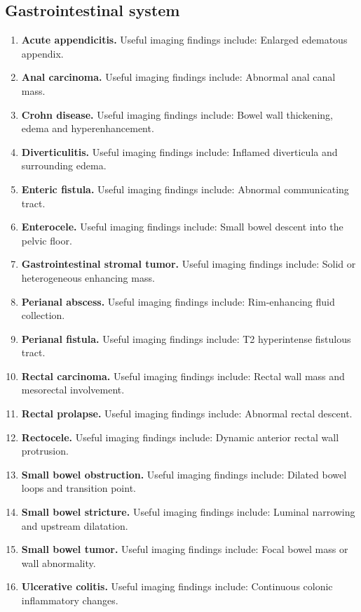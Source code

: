 \subsection{Gastrointestinal system}
\begin{enumerate}[leftmargin=*,itemsep=0.45em,topsep=0.4em]
\item \textbf{Acute appendicitis.} Useful imaging findings include: Enlarged edematous appendix.
\item \textbf{Anal carcinoma.} Useful imaging findings include: Abnormal anal canal mass.
\item \textbf{Crohn disease.} Useful imaging findings include: Bowel wall thickening, edema and hyperenhancement.
\item \textbf{Diverticulitis.} Useful imaging findings include: Inflamed diverticula and surrounding edema.
\item \textbf{Enteric fistula.} Useful imaging findings include: Abnormal communicating tract.
\item \textbf{Enterocele.} Useful imaging findings include: Small bowel descent into the pelvic floor.
\item \textbf{Gastrointestinal stromal tumor.} Useful imaging findings include: Solid or heterogeneous enhancing mass.
\item \textbf{Perianal abscess.} Useful imaging findings include: Rim-enhancing fluid collection.
\item \textbf{Perianal fistula.} Useful imaging findings include: T2 hyperintense fistulous tract.
\item \textbf{Rectal carcinoma.} Useful imaging findings include: Rectal wall mass and mesorectal involvement.
\item \textbf{Rectal prolapse.} Useful imaging findings include: Abnormal rectal descent.
\item \textbf{Rectocele.} Useful imaging findings include: Dynamic anterior rectal wall protrusion.
\item \textbf{Small bowel obstruction.} Useful imaging findings include: Dilated bowel loops and transition point.
\item \textbf{Small bowel stricture.} Useful imaging findings include: Luminal narrowing and upstream dilatation.
\item \textbf{Small bowel tumor.} Useful imaging findings include: Focal bowel mass or wall abnormality.
\item \textbf{Ulcerative colitis.} Useful imaging findings include: Continuous colonic inflammatory changes.
\end{enumerate}

